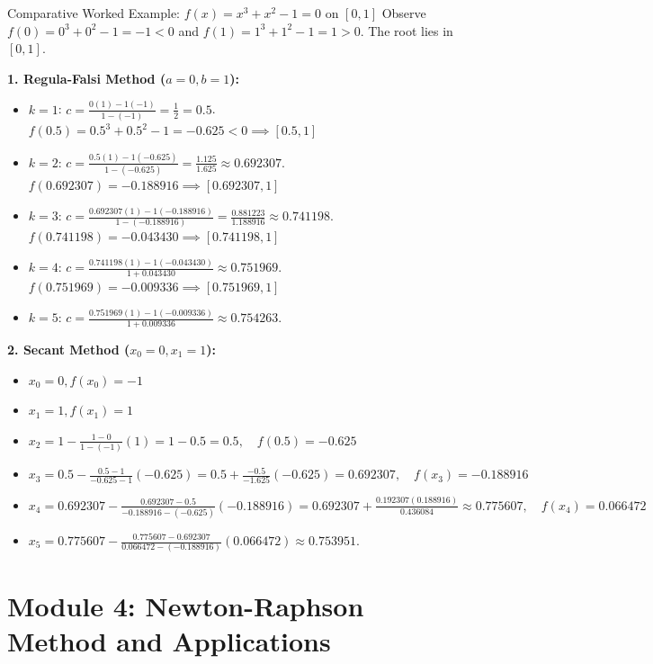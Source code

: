\documentclass[11pt,a4paper]{article}
\begin{document}
\begin{exbox}{Comparative Worked Example: $f(x) = x^3 + x^2 - 1 = 0$ on $[0, 1]$}
Observe $f(0) = 0^3 + 0^2 - 1 = -1 < 0$ and $f(1) = 1^3 + 1^2 - 1 = 1 > 0$. The root lies in $[0, 1]$.

\textbf{1. Regula-Falsi Method ($a=0, b=1$):}
\begin{itemize}
    \item $k=1$: $c = \frac{0(1) - 1(-1)}{1 - (-1)} = \frac{1}{2} = 0.5$. $f(0.5) = 0.5^3 + 0.5^2 - 1 = -0.625 < 0 \implies [0.5, 1]$
    \item $k=2$: $c = \frac{0.5(1) - 1(-0.625)}{1 - (-0.625)} = \frac{1.125}{1.625} \approx 0.692307$. $f(0.692307) = -0.188916 \implies [0.692307, 1]$
    \item $k=3$: $c = \frac{0.692307(1) - 1(-0.188916)}{1 - (-0.188916)} = \frac{0.881223}{1.188916} \approx 0.741198$. $f(0.741198) = -0.043430 \implies [0.741198, 1]$
    \item $k=4$: $c = \frac{0.741198(1) - 1(-0.043430)}{1 + 0.043430} \approx 0.751969$. $f(0.751969) = -0.009336 \implies [0.751969, 1]$
    \item $k=5$: $c = \frac{0.751969(1) - 1(-0.009336)}{1 + 0.009336} \approx \mathbf{0.754263}$.
\end{itemize}

\textbf{2. Secant Method ($x_0 = 0, x_1 = 1$):}
\begin{itemize}
    \item $x_0 = 0, f(x_0) = -1$
    \item $x_1 = 1, f(x_1) = 1$
    \item $x_2 = 1 - \frac{1 - 0}{1 - (-1)}(1) = 1 - 0.5 = 0.5, \quad f(0.5) = -0.625$
    \item $x_3 = 0.5 - \frac{0.5 - 1}{-0.625 - 1}(-0.625) = 0.5 + \frac{-0.5}{-1.625}(-0.625) = 0.692307, \quad f(x_3) = -0.188916$
    \item $x_4 = 0.692307 - \frac{0.692307 - 0.5}{-0.188916 - (-0.625)}(-0.188916) = 0.692307 + \frac{0.192307(0.188916)}{0.436084} \approx 0.775607, \quad f(x_4) = 0.066472$
    \item $x_5 = 0.775607 - \frac{0.775607 - 0.692307}{0.066472 - (-0.188916)}(0.066472) \approx \mathbf{0.753951}$.
\end{itemize}
\end{exbox}

\newpage

\section{Module 4: Newton-Raphson Method and Applications}
\end{document}
